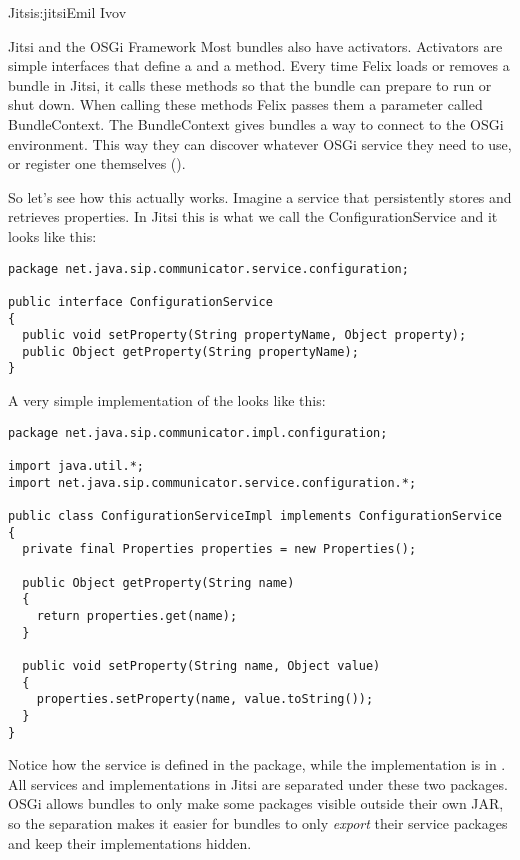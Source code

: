 \begin{aosachapter}{Jitsi}{s:jitsi}{Emil Ivov}
\begin{aosasect1}{Jitsi and the OSGi Framework}
Most bundles also have activators. Activators are simple interfaces
that define a  and a  method. Every time Felix
loads or removes a bundle in Jitsi, it calls these methods so that the
bundle can prepare to run or shut down. When calling these methods
Felix passes them a parameter called BundleContext. The BundleContext
gives bundles a way to connect to the OSGi environment. This way they
can discover whatever OSGi service they need to use, or register one
themselves ().


So let's see how this actually works.  Imagine a service that
persistently stores and retrieves properties. In Jitsi this is what we
call the ConfigurationService and it looks like this:

\pagebreak 

\begin{verbatim}
package net.java.sip.communicator.service.configuration;

public interface ConfigurationService
{
  public void setProperty(String propertyName, Object property);
  public Object getProperty(String propertyName);
}
\end{verbatim}

A very simple implementation of the  looks like
this:

\begin{verbatim}
package net.java.sip.communicator.impl.configuration;

import java.util.*;
import net.java.sip.communicator.service.configuration.*;

public class ConfigurationServiceImpl implements ConfigurationService
{
  private final Properties properties = new Properties();

  public Object getProperty(String name)
  {
    return properties.get(name);
  }

  public void setProperty(String name, Object value)
  {
    properties.setProperty(name, value.toString());
  }
}
\end{verbatim}

\noindent Notice how the service is defined in the
 package, while the
implementation is in . All
services and implementations in Jitsi are separated under these two
packages. OSGi allows bundles to only make some packages visible
outside their own JAR, so the separation makes it easier for bundles
to only \emph{export} their service packages and keep their
implementations hidden.


\end{aosasect1}
\end{aosachapter}
